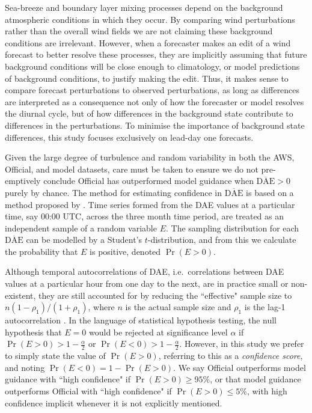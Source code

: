 \documentclass[twocol]{ametsoc}
\DeclareMathOperator{\pr}{Pr}
\begin{document}
Sea-breeze and boundary layer mixing processes depend on the background atmospheric conditions in which they occur. By comparing wind perturbations rather than the overall wind fields we are not claiming these background conditions are irrelevant. However, when a forecaster makes an edit of a wind forecast to better resolve these processes, they are implicitly assuming that future background conditions will be close enough to climatology, or model predictions of background conditions, to justify making the edit. Thus, it makes sense to compare forecast perturbations to observed perturbations, as long as differences are interpreted as a consequence not only of how the forecaster or model resolves the diurnal cycle, but of how differences in the background state contribute to differences in the perturbations. To minimise the importance of background state differences, this study focuses exclusively on lead-day one forecasts.

Given the large degree of turbulence and random variability in both the AWS, Official, and model datasets, care must be taken to ensure we do not pre-emptively conclude Official has outperformed model guidance when $\overline{\text{DAE}}>0$ purely by chance. The method for estimating confidence in $\overline{\text{DAE}}$ is based on a method proposed by \citet{griffiths17}. Time series formed from the DAE values at a particular time, say 00:00 UTC, across the three month time period, are treated as an independent sample of a random variable $E$. The sampling distribution for each $\overline{\text{DAE}}$ can be modelled by a Student's $t$-distribution, and from this we calculate the probability that $E$ is positive, denoted $\pr\left(E > 0\right)$. 

Although temporal autocorrelations of DAE, i.e.~correlations between DAE values at a particular hour from one day to the next, are in practice small or non-existent, they are still accounted for by reducing the ``effective" sample size to $ n \left(1-\rho_1\right)/\left(1+\rho_1\right)$, where $n$ is the actual sample size and $\rho_1$ is the lag-1 autocorrelation \citep{zwiers95,wilks11}. In the language of statistical hypothesis testing, the null hypothesis that $E=0$ would be rejected at significance level $\alpha$ if $\pr(E>0) > 1-\frac{\alpha}{2}$ or $\pr(E<0) > 1-\frac{\alpha}{2}$. However, in this study we prefer to simply state the value of $\pr(E>0)$, referring to this as a \textit{confidence score}, and noting $\pr(E<0) = 1- \pr(E>0)$. We say Official outperforms model guidance with ``high confidence" if $\pr(E>0) \geq 95\%$, or that model guidance outperforms Official with ``high confidence" if $\pr(E>0) \leq 5\%$, with high confidence implicit whenever it is not explicitly mentioned.
\end{document}
